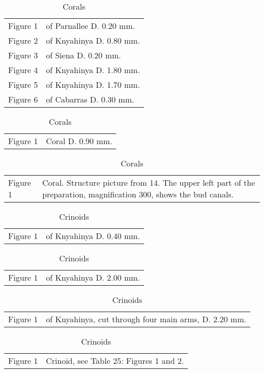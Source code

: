 \documentclass[a4paper, 12pt, oneside]{article}
\begin{document}
\begin{table}[ht!]
\caption{Corals}
\centering
\begin{tabular}{ p{2cm} p{10cm} }
\hline
 Figure 1 & of Parnallee D. 0.20 mm. \\
 Figure 2 & of Knyahinya D. 0.80 mm. \\
 Figure 3 & of Siena D. 0.20 mm. \\
 Figure 4 & of Knyahinya D. 1.80 mm. \\
 Figure 5 & of Knyahinya D. 1.70 mm. \\
 Figure 6 & of Cabarras D. 0.30 mm.
\end{tabular}
\label{table:13}
\end{table}
\begin{table}[ht!]
\caption{Corals}
\centering
\begin{tabular}{ p{2cm} p{10cm} }
\hline
 Figure 1 & Coral D. 0.90 mm.
\end{tabular}
\label{table:14}
\end{table}
\begin{table}[ht!]
\caption{Corals}
\centering
\begin{tabular}{ p{2cm} p{10cm} }
\hline
 Figure 1 & Coral. Structure picture from 14. The upper left part of the preparation, magnification 300, shows the bud canals.
\end{tabular}
\label{table:15}
\end{table}
\begin{table}[ht!]
\caption{Crinoids}
\centering
\begin{tabular}{ p{2cm} p{10cm} }
\hline
 Figure 1 & of Knyahinya D. 0.40 mm.
\end{tabular}
\label{table:16}
\end{table}
\begin{table}[ht!]
\caption{Crinoids}
\centering
\begin{tabular}{ p{2cm} p{10cm} }
\hline
 Figure 1 & of Knyahinya D. 2.00 mm.
\end{tabular}
\label{table:17}
\end{table}
\begin{table}[ht!]
\caption{Crinoids}
\centering
\begin{tabular}{ p{2cm} p{10cm} }
\hline
 Figure 1 & of Knyahinya, cut through four main arms, D. 2.20 mm.
\end{tabular}
\label{table:18}
\end{table}
\begin{table}[ht!]
\caption{Crinoids}
\centering
\begin{tabular}{ p{2cm} p{10cm} }
\hline
 Figure 1 & Crinoid, see Table 25: Figures 1 and 2.
\end{tabular}
\label{table:19}
\end{table}
\end{document}
